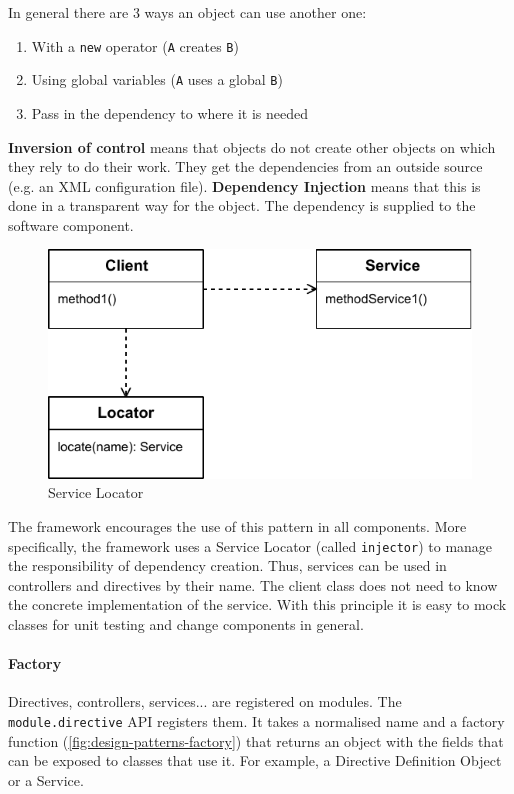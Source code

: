 \cite{Fowler}

In general there are 3 ways an object can use another one:
\begin{enumerate}
	\item With a \texttt{new} operator (\texttt{A} creates \texttt{B})
	\item Using global variables (\texttt{A} uses a global \texttt{B})
	\item Pass in the dependency to where it is needed
\end{enumerate}

\textbf{Inversion of control} means that objects do not create other objects on which they rely to do their work.
They get the dependencies from an outside source (e.g. an \ac{XML} configuration file).
\textbf{Dependency Injection} means that this is done in a transparent way for the object.
The dependency is supplied to the software component.

\begin{figure}[htb]
    \centering
    \includegraphics{figures/design-patterns-servicelocator.pdf}
    \caption{Service Locator}
    \label{fig:design-service-locator}
\end{figure}

The framework encourages the use of this pattern in all components. 
More specifically, the framework uses a Service Locator  (called \texttt{injector}) to manage the responsibility of dependency creation.
Thus, services can be used in controllers and directives by their name.
The client class does not need to know the concrete implementation of the service. 
With this principle it is easy to mock classes for unit testing and change components in general.


\paragraph{Factory} Directives, controllers, services... are registered on modules. 
The \texttt{module.directive} \ac{API} registers them. 
It takes a normalised name and a factory function (\ref{fig:design-patterns-factory}) that returns an object with the fields that can be exposed to classes that use it.
For example, a Directive Definition Object or a Service.

